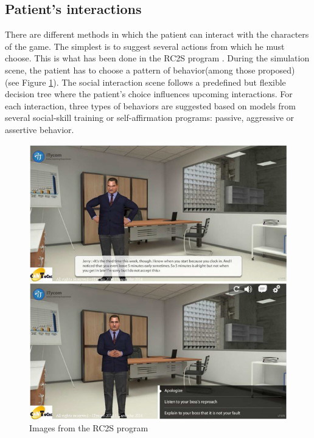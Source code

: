 \documentclass[11pt]{article}
\begin{document}
\subsection{Patient's interactions}
There are different methods in which the patient can interact with the characters of the game. The simplest is to suggest several actions from which he must choose. This is what has been done in the RC2S program \cite{Peyroux14}. During the simulation scene, the patient has to choose a pattern of behavior(among those proposed) (see Figure \ref{Figure RC2S}). The social interaction scene follows a predefined but flexible decision tree where the patient’s choice influences upcoming interactions. For each interaction, three types of behaviors are suggested based on models from several social-skill training or self-affirmation programs: passive, aggressive or assertive behavior.\\

\begin{figure}[h]
   	\centerline{\includegraphics[scale=0.75]{./images/RC2S}}
   	\caption{\label{Figure RC2S} Images from the RC2S program \cite{Peyroux14}}
\end{figure}
\end{document}
